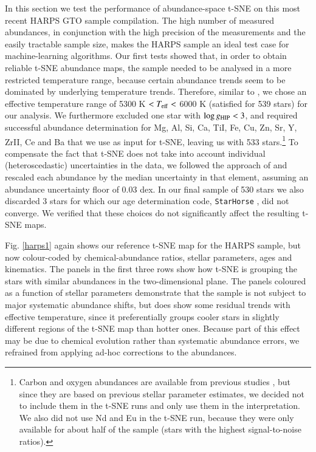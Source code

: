 \documentclass{aa}  %
\begin{document}
In this section we test the performance of abundance-space t-SNE on this most recent HARPS GTO sample compilation. The high number of measured abundances, in conjunction with the high precision of the measurements and the easily tractable sample size, makes the HARPS sample an ideal test case for machine-learning algorithms. 
Our first tests showed that, in order to obtain reliable t-SNE abundance maps, the sample needed to be analysed in a more restricted temperature range, because certain abundance trends seem to be dominated by underlying temperature trends. Therefore, similar to \citet{DelgadoMena2017}, we chose an effective temperature range of 5300 K $<T_{\rm eff}<$ 6000 K (satisfied for 539 stars) for our analysis. We furthermore excluded one star with $\log g_{\rm HIP}<3$, and required successful abundance determination for Mg, Al, Si, Ca, TiI, Fe, Cu, Zn, Sr, Y, ZrII, Ce and Ba that we use as input for t-SNE, leaving us with 533 stars.\footnote{Carbon and oxygen abundances are available from previous studies \citep{Suarez-Andres2017, BertrandeLis2015}, but since they are based on previous stellar parameter estimates, we decided not to include them in the t-SNE runs and only use them in the interpretation. We also did not use Nd and Eu in the t-SNE run, because they were only available for about half of the sample (stars with the highest signal-to-noise ratios).} To compensate the fact that t-SNE does not take into account individual (heteroscedastic) uncertainties in the data, we followed the approach of \citet{Hogg2016} and rescaled each abundance by the median uncertainty in that element, assuming an abundance uncertainty floor of 0.03 dex. In our final sample of 530 stars we also discarded 3 stars for which our age determination code, {\tt StarHorse} \citep{Santiago2016, Queiroz2018}, did not converge. We verified that these choices do not significantly affect the resulting t-SNE maps. 

Fig. \ref{harps1} again shows our reference t-SNE map for the HARPS sample, but now colour-coded by chemical-abundance ratios, stellar parameters, ages and kinematics. The panels in the first three rows show how t-SNE is grouping the stars with similar abundances in the two-dimensional plane. The panels coloured as a function of stellar parameters demonstrate that the sample is not subject to major systematic abundance shifts, but does show some residual trends with effective temperature, since it preferentially groups cooler stars in slightly different regions of the t-SNE map than hotter ones. Because part of this effect may be due to chemical evolution rather than systematic abundance errors, we refrained from applying ad-hoc corrections to the abundances. 
\end{document}
